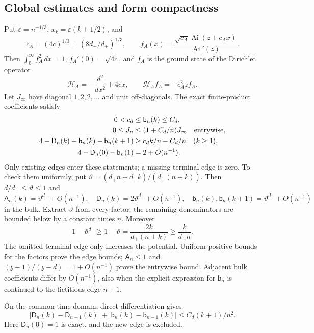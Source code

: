 \documentclass[11pt,letterpaper]{article}
\newcommand{\Ai}{\operatorname{Ai}}
\newcommand{\eps}{\varepsilon}
\theoremstyle{remark}
\begin{document}
\subsection{Global estimates and form compactness}
Put $\eps=n^{-1/3}$, $x_k=\eps(k+1/2)$, and
\begin{equation}\label{tcn:f:airyprofile}
 c_A=(4c)^{1/3}=(8d_-/d_+)^{1/3},\qquad
 f_A(x)=\frac{\sqrt{c_A}\Ai(z+c_Ax)}{\Ai'(z)}.
\end{equation}
Then $\int_0^\infty f_A^2\,dx=1$, $f_A'(0)=\sqrt{4c}$, and $f_A$ is the ground state of the Dirichlet operator
\[
 \mathcal H_A=-\frac{d^2}{dx^2}+4cx,\qquad
 \mathcal H_Af_A=-c_A^2zf_A.
\]
Let $J_\infty$ have diagonal $1,2,2,\ldots$ and unit off-diagonals. The exact finite-product coefficients satisfy
\begin{align}
 0<c_d&\le \mathsf b_n(k)\le C_d,\notag\\
 0\le J_n&\le(1+C_d/n)J_\infty\quad\hbox{entrywise},\label{tcn:f:global}\\
 4-\mathsf D_n(k)-\mathsf b_n(k)-\mathsf b_n(k+1)&\ge c_d k/n-C_d/n\quad(k\ge1),\notag\\
 4-\mathsf D_n(0)-\mathsf b_n(1)&=2+O(n^{-1}).\notag
\end{align}
Only existing edges enter these statements; a missing terminal edge is zero. To check them uniformly, put $\vartheta=(d_+n+d_-k)/(d_+(n+k))$. Then $d/d_+\le \vartheta\le1$ and
\[
 \mathsf A_n(k)=\vartheta^{d_-}+O(n^{-1}),\quad \mathsf D_n(k)=2\vartheta^{d_-}+O(n^{-1}),\quad
 \mathsf b_n(k),\mathsf b_n(k+1)=\vartheta^{d_-}+O(n^{-1})
\]
in the bulk. Extract $\vartheta$ from every factor; the remaining denominators are bounded below by a constant times $n$. Moreover
\[
 1-\vartheta^{d_-}\ge1-\vartheta=\frac{2k}{d_+(n+k)}\ge\frac{k}{d_+n}.
\]
The omitted terminal edge only increases the potential. Uniform positive bounds for the factors prove the edge bounds; $\mathsf A_n\le1$ and $(\mathfrak z-1)/(\mathfrak z-d)=1+O(n^{-1})$ prove the entrywise bound. Adjacent bulk coefficients differ by $O(n^{-1})$, also when the explicit expression for $\mathsf b_n$ is continued to the fictitious edge $n+1$.

On the common time domain, direct differentiation gives
\begin{equation}\label{tcn:f:timederivative}
 |\mathsf D_n(k)-\mathsf D_{n-1}(k)|+|\mathsf b_n(k)-\mathsf b_{n-1}(k)|
 \le C_d(k+1)/n^2.
\end{equation}
Here $\mathsf D_n(0)=1$ is exact, and the new edge is excluded.
\end{document}
